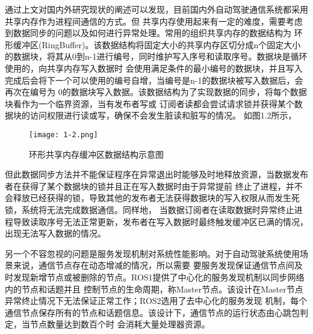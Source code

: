 通过上文对国内外研究现状的阐述可以发现，目前国内外自动驾驶通信系统都采用共享内存作为进程间通信的方式。但
共享内存使用起来有一定的难度，需要考虑到数据同步的问题以及如何进行异常处理。常用的组织共享内存的数据结构为
环形缓冲区(RingBuffer)。该数据结构将固定大小的共享内存区切分成n个固定大小的数据块，将其从0到n-1进行编号，同时维护写入序号和读取序号。数据块是循环使用的，向共享内存写入数据时
会使用满足条件的最小编号的数据块，并且写入完成后会将下一个可以使用的编号自增，当编号是n-1的数据块被写入数据后，会再次在编号为
0的数据块写入数据。该数据结构为了实现数据的同步，将每个数据块看作为一个临界资源，当有发布者写或
订阅者读都会尝试请求锁并获得某个数据块的访问权限进行读或写，确保不会发生脏读和脏写的情况\cite{9235068}。
如图1.2所示，
\begin{figure}[htb]
  \centering
  \texttt{[image: 1-2.png]}
  \caption{环形共享内存缓冲区数据结构示意图}
  \label{2}
\end{figure}
但此数据同步方法并不能保证程序在异常退出时能够及时地释放资源，当数据发布者在获得了某个数据块的锁并且正在写入数据时由于异常提前
终止了进程，并不会释放已经获得的锁，导致其他的发布者无法获得数据块的写入权限从而发生死锁，系统将无法完成数据通信。同样地，
当数据订阅者在读取数据时异常终止进程导致读取序号无法正常更新，发布者在写入数据时最终触发缓冲区已满的情况，出现无法写入数据的情况。

另一个不容忽视的问题是服务发现机制对系统性能影响。对于自动驾驶系统使用场景来说，通信节点存在动态增减的情况，所以需要
要服务发现保证通信节点间及时发现新增节点或被删除的节点。ROS1提供了中心化的服务发现机制以同步网络内的节点和话题并且
控制节点的生命周期，称Master节点。该设计在Master节点异常终止情况下无法保证正常工作；ROS2选用了去中心化的服务发现
机制，每个通信节点保存所有的节点和话题信息。该设计下，通信节点的运行状态由心跳包判定，当节点数量达到数百个时
会消耗大量处理器资源\cite{9355690}。


